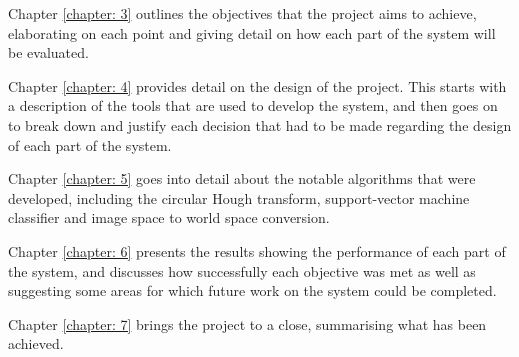 Chapter \ref{chapter: 3} outlines the objectives that the project aims to achieve, elaborating on each point and giving detail on how each part of the system will be evaluated. 

Chapter \ref{chapter: 4} provides detail on the design of the project. This starts with a description of the tools that are used to develop the system, and then goes on to break down and justify each decision that had to be made regarding the design of each part of the system. 

Chapter \ref{chapter: 5} goes into detail about the notable algorithms that were developed, including the circular Hough transform, support-vector machine classifier and image space to world space conversion. 

Chapter \ref{chapter: 6} presents the results showing the performance of each part of the system, and discusses how successfully each objective was met as well as suggesting some areas for which future work on the system could be completed. 

Chapter \ref{chapter: 7} brings the project to a close, summarising what has been achieved.